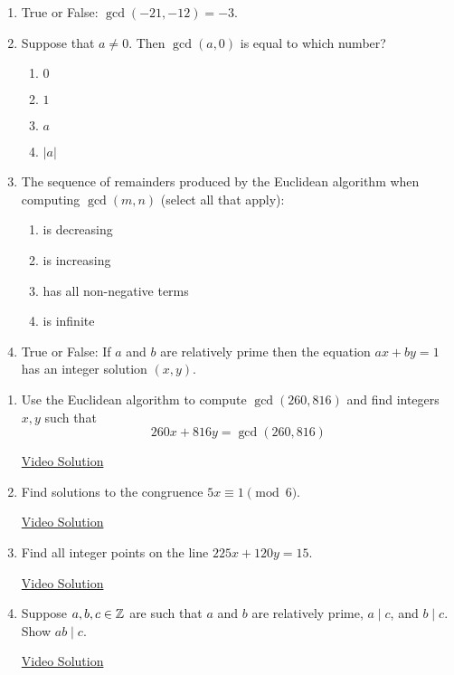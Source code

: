 \pagestyle{empty}


\begin{enumerate}
	\item True or False: $\gcd(-21, -12) = -3$.
    
  \item Suppose that $a \neq 0$. Then $\gcd(a,0)$ is equal to which number?
  \begin{enumerate}
		\item $0$
		\item $1$
		\item $a$
    \item $|a|$
  \end{enumerate}
    
  \item The sequence of remainders produced by the Euclidean algorithm when computing $\gcd(m,n)$ (select all that apply):
  \begin{enumerate}
		\item is decreasing
		\item is increasing
		\item has all non-negative terms
		\item is infinite
	\end{enumerate}
    
  \item True or False: If $a$ and $b$ are relatively prime then the equation $ax+by=1$ has an integer solution $(x,y)$.
\end{enumerate}



\begin{enumerate}
	\item Use the Euclidean algorithm to compute $\gcd(260,816)$ and find integers $x,y$ such that
	\[
		260x+816y=\gcd(260,816)
	\]
    
  \href{https://youtu.be/L-p2fBqYgi0}{Video Solution}
    
  
  \item Find solutions to the congruence $5x\equiv 1\pmod 6$.
    
  \href{https://youtu.be/pCvM5FMgM0c}{Video Solution}
    
  \item Find all integer points on the line $225x + 120y = 15$.
    
  \href{https://youtu.be/WYNwDsiaD7M}{Video Solution}
    
  \item Suppose $a,b,c\in\mathbb{Z}$ are such that $a$ and $b$ are relatively prime, $a\mid c$, and $b\mid c$. Show $ab\mid c$.
    
    \href{https://youtu.be/s5OA-h5GJh0}{Video Solution}
\end{enumerate}